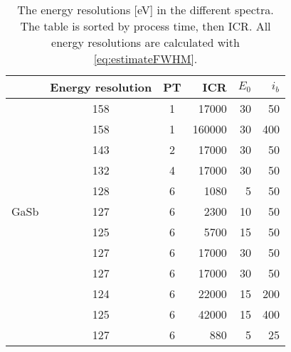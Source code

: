 \begin{table}[htbp]
    \begin{center}
        \caption{
            The energy resolutions [eV] in the different spectra.
            The table is sorted by process time, then ICR.
            All energy resolutions are calculated with \cref{eq:estimateFWHM}.
        }
        \label{tab:results:energy_resolutions}
        \begin{tabular}{p{1.5cm}ccrrr}
            \hline
            \textbf{} & \textbf{Energy resolution} & \textbf{PT} & \textbf{ICR} & \textbf{$E_0$} & \textbf{$i_b$} \\
            \hline
                      & 158                        & 1           & 17000        & 30             & 50             \\
                      & 158                        & 1           & 160000       & 30             & 400            \\
                      & 143                        & 2           & 17000        & 30             & 50             \\
                      & 132                        & 4           & 17000        & 30             & 50             \\
                      & 128                        & 6           & 1080         & 5              & 50             \\
            GaSb      & 127                        & 6           & 2300         & 10             & 50             \\
                      & 125                        & 6           & 5700         & 15             & 50             \\
                      & 127                        & 6           & 17000        & 30             & 50             \\
                      & 127                        & 6           & 17000        & 30             & 50             \\
                      & 124                        & 6           & 22000        & 15             & 200            \\
                      & 125                        & 6           & 42000        & 15             & 400            \\
            \hline
                      & 127                        & 6           & 880          & 5              & 25             \\

\end{tabular}
\end{center}
\end{table}
